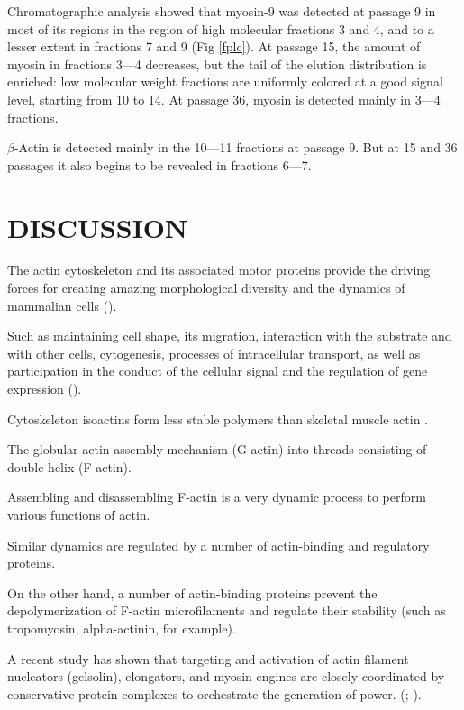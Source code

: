 \documentclass[english,authoryear]{elsarticle}
\begin{document}
Chromatographic analysis showed that myosin-9 was detected at passage 9 in most of its regions in the region of high molecular fractions 3 and 4, and to a lesser extent in fractions 7 and 9 (Fig \ref{fplc}).
At passage 15, the amount of myosin in fractions 3–--4 decreases, but the tail of the elution distribution is enriched: low molecular weight fractions are uniformly colored at a good signal level, starting from 10 to 14.
At passage 36, myosin is detected mainly in 3---4 fractions.

$\beta$-Actin is detected mainly in the 10---11 fractions at passage 9.
But at 15 and 36 passages it also begins to be revealed in fractions 6---7.

\section{DISCUSSION}


The actin cytoskeleton and its associated motor proteins provide the driving forces for creating amazing morphological diversity and the dynamics of mammalian cells (\cite{vasiliev1991polarization}).

Such as maintaining cell shape, its migration, interaction with the substrate and with other cells, cytogenesis, processes of intracellular transport, as well as participation in the conduct of the cellular signal and the regulation of gene expression (\cite{omelchenko2002mechanisms}).

Cytoskeleton isoactins form less stable polymers than skeletal muscle actin \cite{khaitlina2001functional}.

The globular actin assembly mechanism (G-actin) into threads consisting of double helix (F-actin).

Assembling and disassembling F-actin is a very dynamic process to perform various functions of actin.

Similar dynamics are regulated by a number of actin-binding and regulatory proteins.

On the other hand, a number of actin-binding proteins prevent the depolymerization of F-actin microfilaments and regulate their stability (such as tropomyosin, alpha-actinin, for example).

A recent study has shown that targeting and activation of actin filament nucleators (gelsolin), elongators, and myosin engines are closely coordinated by conservative protein complexes to orchestrate the generation of power. (\cite{pantaloni1993profilin}; \cite{sept2001thermodynamics}).
\end{document}
